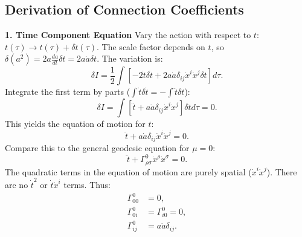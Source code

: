 \documentclass[11pt, a4paper]{report}
\begin{document}
\subsection*{Derivation of Connection Coefficients}
\textbf{1. Time Component Equation}
Vary the action with respect to \(t\): \(t(\tau) \to t(\tau) + \delta t(\tau)\).
The scale factor depends on \(t\), so \(\delta(a^2) = 2a \frac{da}{dt} \delta t = 2a \dot{a} \delta t\).
The variation is:
\begin{equation}
\delta I = \frac{1}{2} \int \left[ -2\dot{t} \delta \dot{t} + 2a\dot{a} \delta_{ij} \dot{x}^i \dot{x}^j \delta t \right] d\tau.
\end{equation}
Integrate the first term by parts (\(\int \dot{t} \delta \dot{t} = -\int \ddot{t} \delta t\)):
\begin{equation}
\delta I = \int \left[ \ddot{t} + a\dot{a} \delta_{ij} \dot{x}^i \dot{x}^j \right] \delta t d\tau = 0.
\end{equation}
This yields the equation of motion for \(t\):
\begin{equation}
\ddot{t} + a\dot{a} \delta_{ij} \dot{x}^i \dot{x}^j = 0.
\end{equation}
Compare this to the general geodesic equation for \(\mu=0\):
\begin{equation}
\ddot{t} + \Gamma^0_{\rho\sigma} \dot{x}^\rho \dot{x}^\sigma = 0.
\end{equation}
The quadratic terms in the equation of motion are purely spatial (\(\dot{x}^i \dot{x}^j\)). There are no \(\dot{t}^2\) or \(\dot{t}\dot{x}^i\) terms. Thus:
\begin{align}
\Gamma^0_{00} &= 0, \\
\Gamma^0_{0i} &= \Gamma^0_{i0} = 0, \\
\Gamma^0_{ij} &= a\dot{a} \delta_{ij}.
\end{align}
\end{document}
